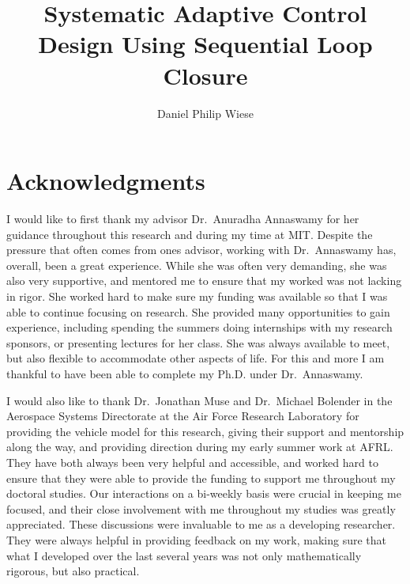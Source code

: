\title{Systematic Adaptive Control Design Using Sequential Loop Closure}
\author{Daniel Philip Wiese}
\maketitle

\cleardoublepage%
\setcounter{savepage}{\thepage}
\begin{abstractpage}
  
\end{abstractpage}

\cleardoublepage%

\section*{Acknowledgments}

I would like to first thank my advisor Dr.\ Anuradha Annaswamy for her guidance throughout this research and during my time at MIT.\@
Despite the pressure that often comes from ones advisor, working with Dr.\ Annaswamy has, overall, been a great experience.
While she was often very demanding, she was also very supportive, and mentored me to ensure that my worked was not lacking in rigor.
She worked hard to make sure my funding was available so that I was able to continue focusing on research.
She provided many opportunities to gain experience, including spending the summers doing internships with my research sponsors, or presenting lectures for her class.
She was always available to meet, but also flexible to accommodate other aspects of life.
For this and more I am thankful to have been able to complete my Ph.D. under Dr.\ Annaswamy.

I would also like to thank Dr.\ Jonathan Muse and Dr.\ Michael Bolender in the Aerospace Systems Directorate at the Air Force Research Laboratory for providing the vehicle model for this research, giving their support and mentorship along the way, and providing direction during my early summer work at AFRL.\@
They have both always been very helpful and accessible, and worked hard to ensure that they were able to provide the funding to support me throughout my doctoral studies.
Our interactions on a bi-weekly basis were crucial in keeping me focused, and their close involvement with me throughout my studies was greatly appreciated.
These discussions were invaluable to me as a developing researcher.
They were always helpful in providing feedback on my work, making sure that what I developed over the last several years was not only mathematically rigorous, but also practical.

